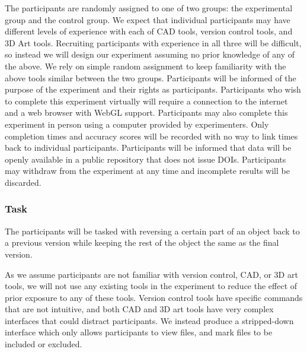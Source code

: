 \documentclass[sigconf,authorversion,nonacm]{acmart}
\begin{document}
The participants are randomly assigned to one of two groups: the experimental group and the control group.
We expect that individual participants may have different levels of experience with each of CAD tools, version control tools, and 3D Art tools.
Recruiting participants with experience in all three will be difficult, so instead we will design our experiment assuming no prior knowledge of any of the above.
We rely on simple random assignment to keep familiarity with the above tools similar between the two groups.
Participants will be informed of the purpose of the experiment and their rights as participants.
Participants who wish to complete this experiment virtually will require a connection to the internet and a web browser with WebGL support.
Participants may also complete this experiment in person using a computer provided by experimenters.
Only completion times and accuracy scores will be recorded with no way to link times back to individual participants.
Participants will be informed that data will be openly available in a public repository that does not issue DOIs.
Participants may withdraw from the experiment at any time and incomplete results will be discarded.

\subsubsection{Task}

The participants will be tasked with reversing a certain part of an object back to a previous version while keeping the rest of the object the same as the final version.

As we assume participants are not familiar with version control, CAD, or 3D art tools, we will not use any existing tools in the experiment to reduce the effect of prior exposure to any of these tools.
Version control tools have specific commands that are not intuitive, and both CAD and 3D art tools have very complex interfaces that could distract participants.
We instead produce a stripped-down interface which only allows participants to view files, and mark files to be included or excluded.
\end{document}

